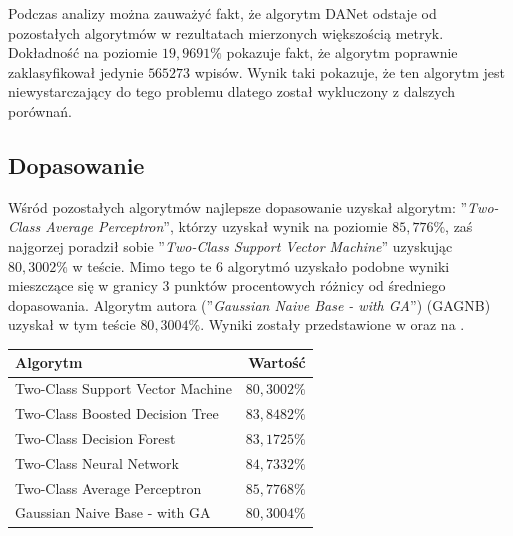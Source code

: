 Podczas analizy można zauważyć fakt, że algorytm DANet odstaje od pozostałych algorytmów w rezultatach mierzonych większością metryk. Dokładność na poziomie $19,9691\%$ pokazuje fakt, że algorytm poprawnie zaklasyfikował jedynie $565273$ wpisów. Wynik taki pokazuje, że ten algorytm jest niewystarczający do tego problemu dlatego został wykluczony z dalszych porównań.

\subsection{Dopasowanie}
Wśród pozostałych algorytmów najlepsze dopasowanie uzyskał algorytm: ''\textit{Two-Class Average Perceptron}'', którzy uzyskał wynik na poziomie $85,776\%$, zaś najgorzej poradził sobie ''\textit{Two-Class Support Vector Machine}'' uzyskując $80,3002\%$ w teście. Mimo tego te 6 algorytmó uzyskało podobne wyniki mieszczące się w granicy 3 punktów procentowych różnicy od średniego dopasowania. Algorytm autora (''\textit{Gaussian Naive Base - with GA}'') (GAGNB) uzyskał w tym teście $80,3004\%$. Wyniki zostały przedstawione w  oraz na .

\begin{table}[H]
    \centering
    \begin{tabular}{|l|r|} \hline
        \textbf{Algorytm} & \textbf{Wartość} \\ \hline
        Two-Class Support Vector Machine & $80,3002\%$ \\ \hline
        Two-Class Boosted Decision Tree & $83,8482\%$ \\ \hline
        Two-Class Decision Forest & $83,1725\%$ \\ \hline
        Two-Class Neural Network & $84,7332\%$ \\ \hline
        Two-Class Average Perceptron & $85,7768\%$ \\ \hline
        Gaussian Naive Base - with GA & $80,3004\%$ \\ \hline
        \end{tabular}
    \label{tab:acc-res}
\end{table}

